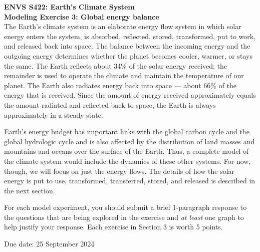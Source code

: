 \documentclass[11pt,letterpaper]{article}
\begin{document}
\textbf{ENVS S422: Earth's Climate System\\
Modeling Exercise 3: Global energy balance}\\%

The Earth's climate system is an elaborate energy flow system in which solar energy enters the system, is absorbed,
reflected, stored, transformed, put to work, and released back into space. The balance between the incoming energy and the
outgoing energy determines whether the planet becomes cooler, warmer, or stays the same. The Earth reflects about 34\% of the solar
energy received; the remainder is used to operate the climate and maintain the temperature of our planet. The Earth also radiates energy
back into space --- about 66\% of the energy that is received. Since the amount of energy received approximately equals the amount radiated and reflected back to space, the Earth is always approximately in a steady-state.

Earth's energy budget has important links with the global carbon cycle and the global hydrologic cycle and is also affected by
the distribution of land masses and mountains and oceans over the surface of the Earth. Thus, a complete model of the
climate system would include the dynamics of these other systems. For now, though, we will focus on just the energy flows. The details of how the solar energy is put to use, transformed, transferred, stored, and released is described in the next section. 

For each model experiment, you should submit a brief 1-paragraph response to the questions that are being explored in the exercise and \textit{at least} one graph to help justify your response. Each exercise in Section 3 is worth 5 points.

Due date: 25 September 2024

\end{document}
